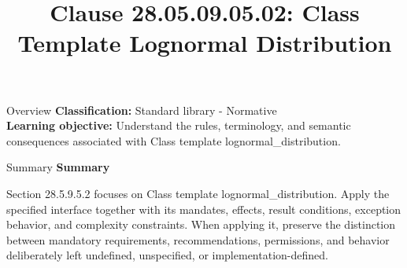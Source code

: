 \documentclass[10pt,letterpaper]{article}
\title{Clause 28.05.09.05.02: Class Template Lognormal Distribution}
\author{}
\date{}
\begin{document}
\maketitle
\begin{CornellOverviewBox}{Overview}
\textbf{Classification:} Standard library - Normative\\[2pt]
\textbf{Learning objective:} Understand the rules, terminology, and semantic consequences associated with Class template lognormal\_distribution.
\end{CornellOverviewBox}\begin{CornellSummaryBox}{Summary}
{\sffamily\bfseries\color{Accent} Summary}\par\vspace{3pt}Section 28.5.9.5.2 focuses on Class template lognormal\_distribution. Apply the specified interface together with its mandates, effects, result conditions, exception behavior, and complexity constraints. When applying it, preserve the distinction between mandatory requirements, recommendations, permissions, and behavior deliberately left undefined, unspecified, or implementation-defined.
\end{CornellSummaryBox}
\end{document}
